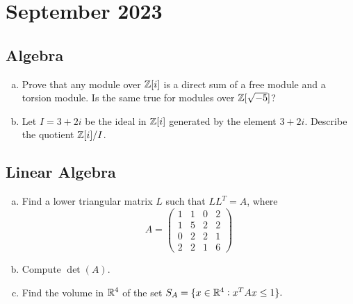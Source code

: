 \chapter{September 2023}


\section{Algebra}

\begin{problem}
	\begin{enumerate}[(a)]
		\item Prove that any module over $ \mathbb{Z}[i] $ is a direct sum of a free module and a torsion module. Is the same true for modules over $ \mathbb{Z}[\sqrt{-5}] $?
		\item Let $ I = 3+2i $ be the ideal in $ \mathbb{Z}[i] $ generated by the element $ 3+2i $. Describe the quotient $ \mathbb{Z}[i]/I $.
	\end{enumerate}
\end{problem}


\section{Linear Algebra}
\begin{problem}
	\begin{enumerate}[(a)]
		\item Find a lower triangular matrix $ L $ such that $ LL^T = A $, where 
		\[ A = \begin{pmatrix}
			1 & 1 & 0 & 2 \\
			1 & 5 & 2 & 2 \\
			0 & 2 & 2 & 1 \\
			2 & 2 & 1 & 6
		\end{pmatrix} \]
		\item Compute $ \det(A) $.
		
		\item Find the volume in $ \mathbb{R}^4 $ of the set $ S_A = \{x\in \mathbb{R}^4: x^T A x \leq 1\}.  $
	\end{enumerate}
\end{problem}


